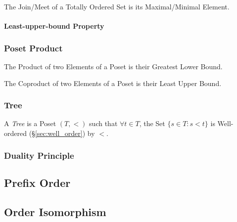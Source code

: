 The Join/Meet of a Totally Ordered Set is its Maximal/Minimal Element.



\paragraph{Least-upper-bound Property}\label{sec:leastupperbound_property}



\subsubsection{Poset Product}\label{sec:poset_product}

The Product of two Elements of a Poset is their Greatest Lower Bound.

The Coproduct of two Elements of a Poset is their Least Upper Bound.



\subsubsection{Tree}\label{sec:tree}

A \emph{Tree} is a Poset $(T,<)$ such that $\forall t \in T$, the Set
$\{s \in T : s < t \}$ is Well-ordered (\S\ref{sec:well_order}) by
$<$.



\subsubsection{Duality Principle}\label{sec:duality_principle}



\subsection{Prefix Order}\label{sec:prefix_order}

\subsection{Order Isomorphism}\label{sec:order_isomorphism}


